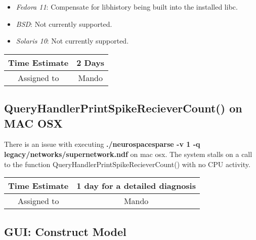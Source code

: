 \documentclass[12pt]{article}
\begin{document}
\begin{itemize}
\item {\it Fedora 11}: Compensate for libhistory being built into the
  installed libc.
\item {\it BSD}: Not currently supported.
\item {\it Solaris 10}: Not currently supported.
\end{itemize}

\begin{center}
  \vspace{5mm}
  \centering
  \begin{tabular}{|c|c|}
    \hline
    Time Estimate
    & 2 Days\\
    \hline
    Assigned to
    & Mando \\
    \hline
  \end{tabular}
\end{center}


\subsection{QueryHandlerPrintSpikeRecieverCount() on MAC OSX}

There is an issue with executing {\bf ./neurospacesparse -v 1 -q
  legacy/networks/supernetwork.ndf} on mac osx. The system stalls on a
call to the function QueryHandlerPrintSpikeRecieverCount() with no CPU
activity.

\begin{center}
  \vspace{5mm}
  \centering
  \begin{tabular}{|c|c|}
    \hline
    Time Estimate
    & 1 day for a detailed diagnosis \\
    \hline
    Assigned to
    & Mando \\
    \hline
  \end{tabular}
\end{center}


\subsection{GUI: Construct Model}
\end{document}
